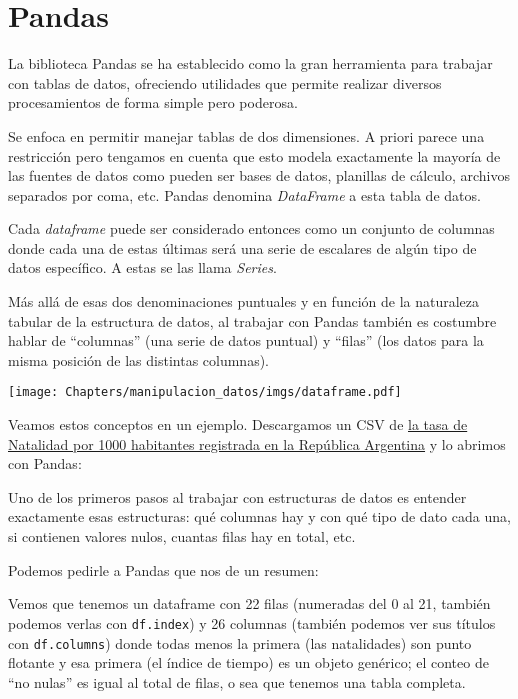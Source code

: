 \section{Pandas}

La biblioteca Pandas se ha establecido como la gran herramienta para trabajar con tablas de datos, ofreciendo utilidades que permite realizar diversos procesamientos de forma simple pero poderosa.

Se enfoca en permitir manejar tablas de dos dimensiones. A priori parece una restricción pero tengamos en cuenta que esto modela exactamente la mayoría de las fuentes de datos como pueden ser bases de datos, planillas de cálculo, archivos separados por coma, etc. Pandas denomina \textit{DataFrame} a esta tabla de datos.

Cada \textit{dataframe} puede ser considerado entonces como un conjunto de columnas donde cada una de estas últimas será una serie de escalares de algún tipo de datos específico. A estas se las llama \textit{Series}.

Más allá de esas dos denominaciones puntuales y en función de la naturaleza tabular de la estructura de datos, al trabajar con Pandas también es costumbre hablar de ``columnas'' (una serie de datos puntual) y ``filas'' (los datos para la misma posición de las distintas columnas).

\begin{center}
    \texttt{[image: Chapters/manipulacion\_datos/imgs/dataframe.pdf]}
\end{center}

Veamos estos conceptos en un ejemplo. Descargamos un CSV de \href{https://www.datos.gob.ar/dataset/salud-tasa-natalidad}{la tasa de Natalidad por 1000 habitantes registrada en la República Argentina} y lo abrimos con Pandas:


Uno de los primeros pasos al trabajar con estructuras de datos es entender exactamente esas estructuras: qué columnas hay y con qué tipo de dato cada una, si contienen valores nulos, cuantas filas hay en total, etc. 

Podemos pedirle a Pandas que nos de un resumen:


Vemos que tenemos un dataframe con 22 filas (numeradas del 0 al 21, también podemos verlas con \texttt{df.index}) y 26 columnas (también podemos ver sus títulos con \texttt{df.columns}) donde todas menos la primera (las natalidades) son punto flotante y esa primera (el índice de tiempo) es un objeto genérico; el conteo de ``no nulas'' es igual al total de filas, o sea que tenemos una tabla completa.

